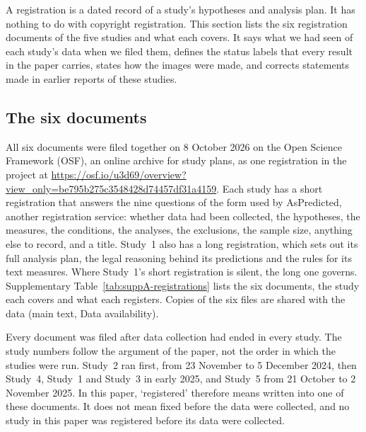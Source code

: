 \label{sec:suppA-registrations}

A registration is a dated record of a study's hypotheses and analysis plan. It has nothing to do with copyright registration. This section lists the six registration documents of the five studies and what each covers. It says what we had seen of each study's data when we filed them, defines the status labels that every result in the paper carries, states how the images were made, and corrects statements made in earlier reports of these studies.

\subsection*{The six documents}

All six documents were filed together on 8 October 2026 on the Open Science Framework (OSF), an online archive for study plans, as one registration in the project at \url{https://osf.io/u3d69/overview?view_only=be795b275c3548428d74457df31a4159}. Each study has a short registration that answers the nine questions of the form used by AsPredicted, another registration service: whether data had been collected, the hypotheses, the measures, the conditions, the analyses, the exclusions, the sample size, anything else to record, and a title. Study~1 also has a long registration, which sets out its full analysis plan, the legal reasoning behind its predictions and the rules for its text measures. Where Study~1's short registration is silent, the long one governs. Supplementary Table~\ref{tab:suppA-registrations} lists the six documents, the study each covers and what each registers. Copies of the six files are shared with the data (main text, Data availability).



Every document was filed after data collection had ended in every study. The study numbers follow the argument of the paper, not the order in which the studies were run. Study~2 ran first, from 23 November to 5 December 2024, then Study~4, Study~1 and Study~3 in early 2025, and Study~5 from 21 October to 2 November 2025. In this paper, `registered' therefore means written into one of these documents. It does not mean fixed before the data were collected, and no study in this paper was registered before its data were collected.

